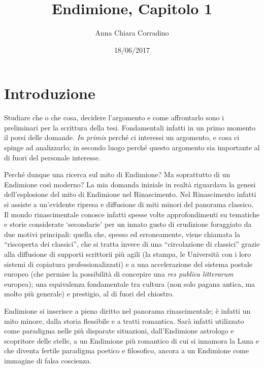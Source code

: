 \documentclass[12pt,a4paper,openright, oneside]{book}
\title{Endimione, Capitolo 1}
\author{Anna Chiara Corradino}
\date{18/06/2017}
\begin{document}
\maketitle
\thispagestyle{empty}
\renewcommand{\contentsname}{\textbf{Sommario}}
{\linespread{1}{\tableofcontents}}


\chapter*{Introduzione}
\renewcommand{\thechapter}{\Roman{chapter}}
\renewcommand{\thesection}{\thechapter \Roman{section}}
Studiare che o che cosa, decidere l'argomento e come affrontarlo sono i preliminari per la scrittura della tesi. Fondamentali infatti in un primo momento il porsi delle domande. \textit{In primis} perché ci interessi un argomento, e cosa ci spinge ad analizzarlo; in secondo luogo perché questo argomento sia importante al di fuori del personale interesse. 

Perché dunque una ricerca sul mito di Endimione? Ma soprattutto di un Endimione così moderno?  La mia domanda iniziale in realtà riguardava la genesi dell'esplosione del mito di Endimione nel Rinascimento. Nel Rinascimento infatti si assiste a un'evidente ripresa e diffusione di miti minori del panorama classico. Il mondo rinascimentale conosce infatti spesse volte approfondimenti su tematiche e storie considerate `secondarie' per un innato gusto di erudizione foraggiato da due motivi principali: quella che, spesso ed erroneamente, viene chiamata la ``riscoperta dei classici'', che si tratta invece di una ``circolazione di classici'' grazie alla diffusione di supporti scrittorii più agili (la stampa, le Università con i loro sistemi di copiatura professionalizzati) e a una accelerazione del sistema postale europeo (che permise la possibilità di concepire una \textit{res publica litterarum} europea); una equivalenza fondamentale tra cultura (non solo pagana antica, ma molto più generale) e prestigio, al di fuori del chiostro.

Endimione si inserisce a pieno diritto nel panorama rinascimentale; è infatti un mito minore, dalla storia flessibile e a tratti romantica. Sarà infatti utilizzato come paradigma nelle più disparate situazioni, dall'Endimione astrologo e scopritore delle stelle, a un Endimione più romantico di cui si innamora la Luna e che diventa fertile paradigma poetico e filosofico, ancora a un Endimione come immagine di falsa coscienza. 
\end{document}
